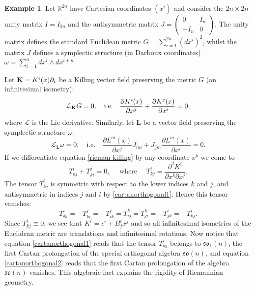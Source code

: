 \documentclass[12pt,reqno,a4paper]{amsart}
\theoremstyle{definition}
\newtheorem{example}{Example}[section]
\begin{document}
\begin{example}\label{killing example}
Let $\mathbb{R}^{2n}$ have Cartesian coordinates $(x^i)$ and consider the
$2n\times 2n$ unity matrix $I=I_{2n}$
and the antisymmetric matrix $J = \begin{pmatrix} 0&I_n\\-I_n&0\end{pmatrix}$.
The unity matrix
defines the standard Euclidean metric $G = \sum^{2n}_{i=1}(dx^i)^2$, whilst
 the matrix $J$ defines
a symplectic structure (in Darboux coordinates)
${\omega} = \sum^{n}_{i=1}dx^i\wedge dx^{i+n}$.

Let ${{\bf K}} = K^i(x){\partial}_i$ be a Killing vector field preserving the metric $G$
(an infinitesimal isometry):
    \begin{equation}\label{rieman killing}
    {{\mathcal{L}}}_{{\bf K}} G = 0,\quad \mbox{i.e.}\quad \frac{{\partial} K^i(x)}{{\partial} x^j}
     + \frac{{\partial} K^j(x)}{{\partial} x^i} = 0,
    \end{equation}
where ${{\mathcal{L}}}$ is the Lie derivative. Similarly, let ${\mathbf{L}}$ be a vector field
preserving the symplectic structure $\omega$:
    \begin{equation}\label{symp killing}
    {{\mathcal{L}}}_{\mathbf{L}}\omega = 0,\quad \mbox{i.e.}\quad \frac{{\partial} L^m(x)}{{\partial} x^j}J_{mi}
     + J_{jm}\frac{{\partial} L^m(x)}{{\partial} x^i} = 0.
    \end{equation}
If we differentiate equation \eqref{rieman killing} by any coordinate $x^k$ we come to
    \begin{equation}\label{cartanorthogonal1}
    T^i_{kj}+T^j_{ki}=0,\quad\mbox{ where } \quad T^i_{kj} = \frac{{\partial}^2K^i}{{\partial} x^k{\partial} x^j}.
    \end{equation}
The tensor $T^i_{kj}$ is symmetric
with respect to the lower indices $k$ and $j$,
and antisymmetric in indices $j$ and $i$ by \eqref{cartanorthogonal1}. Hence this
tensor vanishes:
    \begin{equation}\label{cartanorthogonal2}
    T^i_{kj} = -T^j_{ki} = -T^j_{ik} = T^k_{ij} = T^k_{ji} = -T^i_{jk} = -T^i_{kj}.
    \end{equation}
Since $T^i_{kj}\equiv 0$, we see that
 $K^i=c^i+B^i_jx^j$ and so all infinitesimal
isometries of the Euclidean metric are translations
and infinitesimal rotations.
 Now notice that equation \eqref{cartanorthogonal1}
reads that the tensor $T^i_{kj}$
 belongs to $\mathfrak{so}_1(n)$, the first Cartan prolongation of the special
 orthogonal algebra $\mathfrak{so}(n)$, and equation \eqref{cartanorthogonal2}
 reads that the first Cartan prolongation of
the algebra $\mathfrak{so}(n)$ vanishes.
 This algebraic fact explains the rigidity of Riemannian geometry.


\end{example}
\end{document}
